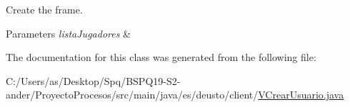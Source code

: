 Create the frame. 
\begin{DoxyParams}{Parameters}
{\em lista\+Jugadores} & \\
\hline
\end{DoxyParams}


The documentation for this class was generated from the following file\+:\begin{DoxyCompactItemize}
\item 
C\+:/\+Users/as/\+Desktop/\+Spq/\+B\+S\+P\+Q19-\/\+S2-\/ander/\+Proyecto\+Procesos/src/main/java/es/deusto/client/\mbox{\hyperlink{_v_crear_usuario_8java}{V\+Crear\+Usuario.\+java}}\end{DoxyCompactItemize}
